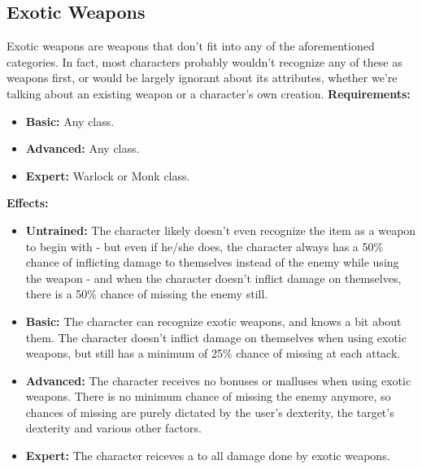 \documentclass[openany,10pt,a4paper]{book}
\begin{document}
\subsection{Exotic Weapons}
\begin{table}[!ht]
\centering
{}
\end{table}
Exotic weapons are weapons that don't fit into any of the aforementioned categories. In fact, most characters probably wouldn't recognize any of these as weapons first, or would be largely ignorant about its attributes, whether we're talking about an existing weapon or a character's own creation.
\textbf{Requirements:}
\begin{itemize}
	\item \textbf{Basic:} Any class.
	\item \textbf{Advanced:} Any class.
	\item \textbf{Expert:} Warlock or Monk class.
\end{itemize}
\textbf{Effects:}
\begin{itemize}
	\item \textbf{Untrained:} The character likely doesn't even recognize the item as a weapon to begin with - but even if he/she does, the character always has a 50\% chance of inflicting damage to themselves instead of the enemy while using the weapon - and when the character doesn't inflict damage on themselves, there is a 50\% chance of missing the enemy still.
	\item \textbf{Basic:} The character can recognize exotic weapons, and knows a bit about them. The character doesn't inflict damage on themselves when using exotic weapons, but still has a minimum of 25\% chance of missing at each attack.
	\item \textbf{Advanced:} The character receives no bonuses or malluses when using exotic weapons. There is no minimum chance of missing the enemy anymore, so chances of missing are purely dictated by the user's dexterity, the target's dexterity and various other factors.
	\item \textbf{Expert:} The character reiceves a  to all damage done by exotic weapons.
\end{itemize}\newpage
\end{document}
